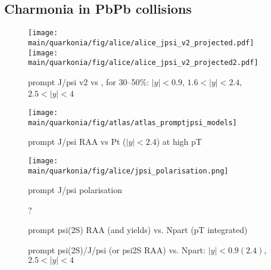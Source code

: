 \documentclass[../report.tex]{subfiles}
\providecommand{\main}{..}
\begin{document}
\subsection{Charmonia in PbPb collisions} %

\begin{figure}

\begin{center}
 \texttt{[image: \\main/quarkonia/fig/alice/alice\_jpsi\_v2\_projected.pdf]}
 \texttt{[image: \\main/quarkonia/fig/alice/alice\_jpsi\_v2\_projected2.pdf]}
\end{center}

 \caption{prompt J/psi v2 vs \pt, for 30--50\%: $|y|<0.9$, $1.6<|y|<2.4$, $2.5<|y|<4$~\cite{Abelevetal:2014cna,CERN-LHCC-2013-014}}
\end{figure}

\begin{figure}
\begin{center}
 \texttt{[image: \\main/quarkonia/fig/atlas/atlas\_promptjpsi\_models]}
\end{center}

 \caption{prompt J/psi RAA vs Pt ($|y|<2.4$) at high pT~\cite{Aaboud:2018quy}}
\end{figure}

\begin{figure}
\begin{center}
\texttt{[image: \\main/quarkonia/fig/alice/jpsi\_polarisation.png]}
\end{center}

 \caption{prompt J/psi polarisation~\cite{Abelev:1475243}}
\end{figure}

\begin{figure}
\begin{center}
 ?
\end{center}

 \caption{prompt psi(2S) RAA (and yields) vs. Npart (pT integrated) }
\end{figure}

\begin{figure}
\begin{center}
\end{center}

 \caption{prompt psi(2S)/J/psi (or psi2S RAA) vs. Npart: $|y|<0.9 (2.4)$, $2.5<|y|<4$}
\end{figure}
\end{document}
